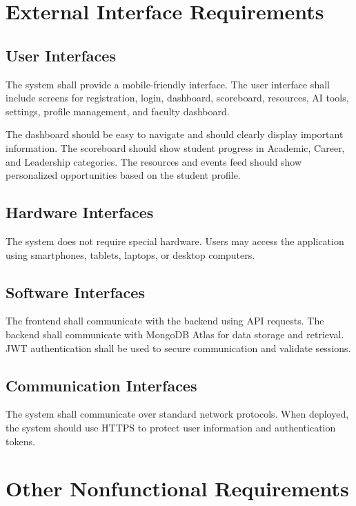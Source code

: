 \documentclass{scrreprt}
\begin{document}
\chapter{External Interface Requirements}

\section{User Interfaces}
The system shall provide a mobile-friendly interface. The user interface shall include screens for registration, login, dashboard, scoreboard, resources, AI tools, settings, profile management, and faculty dashboard.

The dashboard should be easy to navigate and should clearly display important information. The scoreboard should show student progress in Academic, Career, and Leadership categories. The resources and events feed should show personalized opportunities based on the student profile.

\section{Hardware Interfaces}
The system does not require special hardware. Users may access the application using smartphones, tablets, laptops, or desktop computers.

\section{Software Interfaces}
The frontend shall communicate with the backend using API requests. The backend shall communicate with MongoDB Atlas for data storage and retrieval. JWT authentication shall be used to secure communication and validate sessions.

\section{Communication Interfaces}
The system shall communicate over standard network protocols. When deployed, the system should use HTTPS to protect user information and authentication tokens.

\chapter{Other Nonfunctional Requirements}
\end{document}
